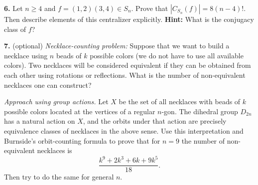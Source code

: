 \documentclass[12pt]{amsart}
\begin{document}
{\bf 6.} Let $n\geq 4$ and $f=(1,2)(3,4)\in S_n$. Prove that 
$|C_{S_n}(f)|=8 (n-4)!$. Then describe elements of this 
centralizer explicitly. {\bf Hint:} What is the conjugacy
class of $f$?
\skv

{\bf 7.} (optional) {\it Necklace-counting problem:}
Suppose that we want to build a necklace using $n$ beads of $k$ possible colors
(we do not have to use all available colors). Two necklaces will be considered equivalent 
if they can be obtained from each other using rotations or reflections. What is the number 
of non-equivalent necklaces one can construct?

{\it Approach using group actions.} Let $X$ be the set of all necklaces with
beads of $k$ possible colors located at the vertices of a regular $n$-gon. The dihedral
group $D_{2n}$ has a natural action on $X$, and the orbits under that action
are precisely equivalence classes of necklaces in the above sense. Use this
interpretation and Burnside's orbit-counting formula to prove that for $n=9$ the number of 
non-equivalent necklaces is
$$\frac{k^9+2k^3+6k+9k^5}{18}.$$
Then try to do the same for general $n$. 
\end{document}
